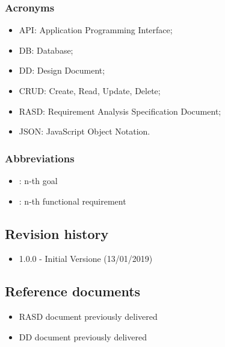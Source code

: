 \documentclass{article}
\begin{document}
\subsubsection{Acronyms}
\begin{itemize}
	\item API: Application Programming Interface;
	\item DB: Database;
	\item DD: Design Document;
	\item CRUD: Create, Read, Update, Delete;
	\item RASD: Requirement Analysis Specification Document;
	\item JSON: JavaScript Object Notation.
\end{itemize}

\subsubsection{Abbreviations}
\begin{itemize}
	\item \begin{math}[Gn]\end{math}: n-th goal
	\item \begin{math}[Rn]\end{math}: n-th functional requirement
\end{itemize}

\subsection{Revision history}
\begin{itemize}
	\item 1.0.0 - Initial Versione (13/01/2019)
\end{itemize}

\subsection{Reference documents}
\begin{itemize}
	\item RASD document previously delivered
	\item DD document previously delivered
\end{itemize}

\newpage
\end{document}
